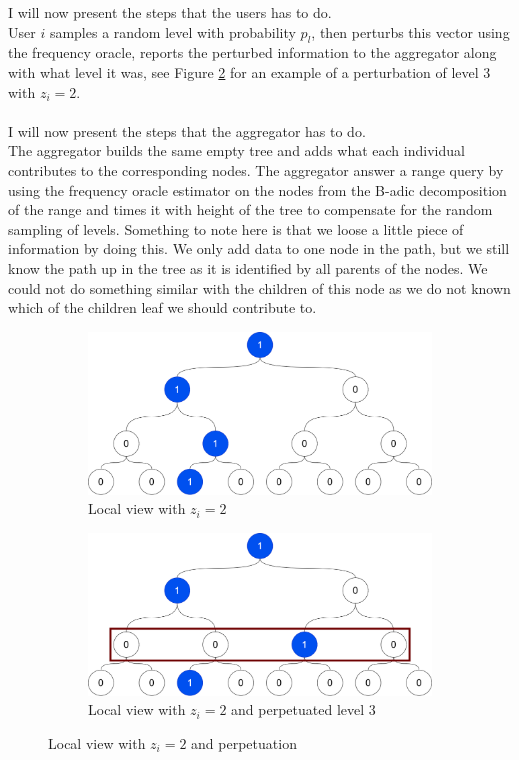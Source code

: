 \documentclass[11pt]{article}
\theoremstyle{definition}
\begin{document}
\noindent I will now present the steps that the users has to do. \\
User $i$ samples a random level with probability $p_l$, then 
perturbs this vector using the frequency oracle, reports the perturbed information to the aggregator along with what level it was, see Figure \ref{fig:sub2} for an example of a perturbation of level 3 with $z_i=2$. \\ \\
\noindent I will now present the steps that the aggregator has to do. \\
The aggregator builds the same empty tree and adds what each individual contributes to the corresponding nodes. The aggregator answer a range query by using the frequency oracle estimator on the nodes from the B-adic decomposition of the range and times it with height of the tree to compensate for the random sampling of levels. Something to note here is that we loose a little piece of information by doing this. We only add data to one node in the path, but we still know the path up in the tree as it is identified by all parents of the nodes. We could not do something similar with the children of this node as we do not known which of the children leaf we should contribute to. 

\begin{figure}[H]
\centering
\begin{subfigure}{.5\textwidth}
  \centering
  \includegraphics[width=.8\linewidth]{figures/binary_tree_path_1.png}
  \caption{Local view with $z_i=2$}
  \label{fig:sub1}
\end{subfigure}%
\begin{subfigure}{.5\textwidth}
  \centering
  \includegraphics[width=.8\linewidth]{figures/binary_tree_path_1_sample.png}
  \caption{Local view with $z_i=2$ and perpetuated level 3}
  \label{fig:sub2}
\end{subfigure}
\caption{Local view with $z_i=2$ and perpetuation}
\label{fig:binary_tree}
\end{figure}
\end{document}
